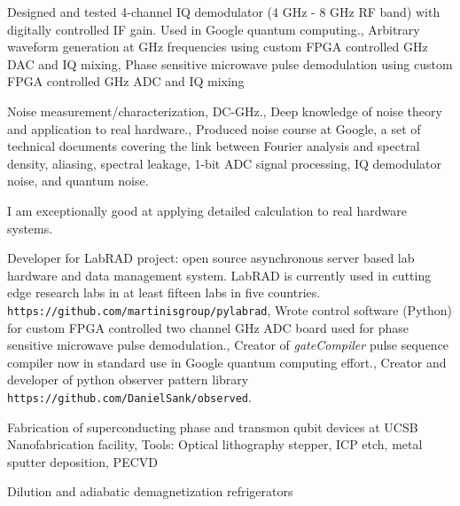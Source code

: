 {
  {Designed and tested 4-channel IQ demodulator (4 GHz - 8 GHz RF band) with digitally controlled IF gain. Used in Google quantum computing.},
  {Arbitrary waveform generation at GHz frequencies using custom FPGA controlled GHz DAC and IQ mixing},
  {Phase sensitive microwave pulse demodulation using custom FPGA controlled GHz ADC and IQ mixing}
}

{
  {Noise measurement/characterization, DC-GHz.},
  {Deep knowledge of noise theory and application to real hardware.},
  {Produced noise course at Google, a set of technical documents covering the link between Fourier analysis and spectral density, aliasing, spectral leakage, 1-bit ADC signal processing, IQ demodulator noise, and quantum noise.}
}

{I am exceptionally good at applying detailed calculation to real hardware systems.}

{
  {Developer for LabRAD project: open source asynchronous server based lab hardware and data management system. LabRAD is currently used in cutting edge research labs in at least fifteen labs in five countries.\\\texttt{https://github.com/martinisgroup/pylabrad}},
  {Wrote control software (Python) for custom FPGA controlled two channel GHz ADC board used for phase sensitive microwave pulse demodulation.},
  {Creator of \emph{gateCompiler} pulse sequence compiler now in standard use in Google quantum computing effort.},
  {Creator and developer of python observer pattern library \\ \quad \texttt{https://github.com/DanielSank/observed}.}
}

{
  {Fabrication of superconducting phase and transmon qubit devices at UCSB Nanofabrication facility},
  {Tools: Optical lithography stepper, ICP etch, metal sputter deposition, PECVD}
}

{
  {Dilution and adiabatic demagnetization refrigerators}
}
